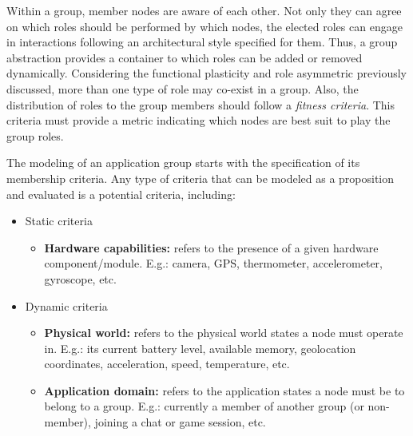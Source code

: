 



Within a group, member nodes are aware of each other. Not only they can agree on which roles should be performed by which nodes, the elected roles can engage in interactions following an architectural style specified for them. Thus, a group abstraction provides a container to which roles can be added or removed dynamically. Considering the functional plasticity and role asymmetric previously discussed, more than one type of role may co-exist in a group. Also, the distribution of roles to the group members should follow a \textit{fitness criteria}. This criteria must provide a metric indicating which nodes are best suit to play the group roles.

The modeling of an application group starts with the specification of its membership criteria. Any type of criteria that can be modeled as a proposition and evaluated is a potential criteria, including:

\begin{itemize}
	
	\item Static criteria
	
	\begin{itemize}
		
		\item \textbf{Hardware capabilities:} refers to the presence of a given hardware component/module. E.g.: camera, GPS, thermometer, accelerometer, gyroscope, etc.
		
	\end{itemize}
	
	\item Dynamic criteria
	
	\begin{itemize}
		
		\item \textbf{Physical world:} refers to the physical world states a node must operate in. E.g.: its current battery level, available memory, geolocation coordinates, acceleration, speed, temperature, etc.
		
		\item \textbf{Application domain:} refers to the application states a node must be to belong to a group. E.g.: currently a member of another group (or non-member), joining a chat or game session, etc.
		
	\end{itemize}
	
\end{itemize}


